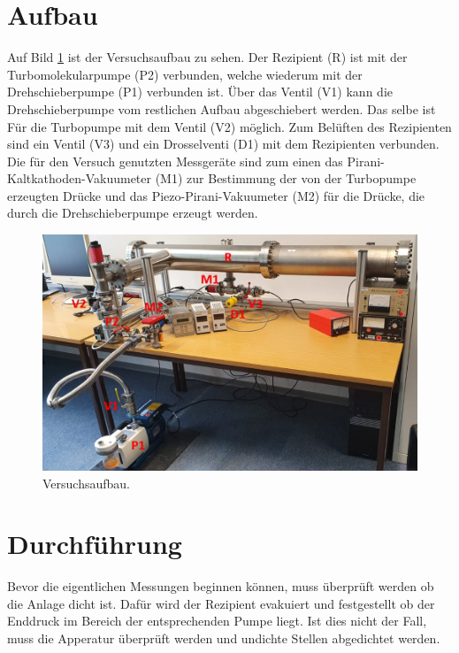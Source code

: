 \section{Aufbau}
\label{sec:Aufbau}
Auf Bild \ref{fig:Versuchsaufbau} ist der Versuchsaufbau zu sehen. Der Rezipient (R) ist mit der Turbomolekularpumpe (P2) verbunden, 
welche wiederum mit der Drehschieberpumpe (P1) verbunden ist. Über das Ventil (V1) kann die Drehschieberpumpe vom 
restlichen Aufbau abgeschiebert werden. Das selbe ist Für die Turbopumpe mit dem Ventil (V2) möglich.
Zum Belüften des Rezipienten sind ein Ventil (V3) und ein Drosselventi (D1) mit dem Rezipienten verbunden.
Die für den Versuch genutzten Messgeräte sind zum einen das Pirani-Kaltkathoden-Vakuumeter (M1) zur Bestimmung der 
von der Turbopumpe erzeugten Drücke und das Piezo-Pirani-Vakuumeter (M2) für die Drücke, die durch die Drehschieberpumpe 
erzeugt werden.

    \begin{figure}
        \centering
        \label{fig:Versuchsaufbau}
        \includegraphics[width=1\textwidth]{Versuchsaufbau_V70.jpeg}
        \caption{Versuchsaufbau.}
    \end{figure}


\section{Durchführung}
\label{sec:Durchführung}
Bevor die eigentlichen Messungen beginnen können, muss überprüft werden ob die Anlage dicht ist.
Dafür wird der Rezipient evakuiert und festgestellt ob der Enddruck im Bereich der entsprechenden Pumpe liegt. 
Ist dies nicht der Fall, muss die Apperatur überprüft werden und undichte Stellen abgedichtet werden.

